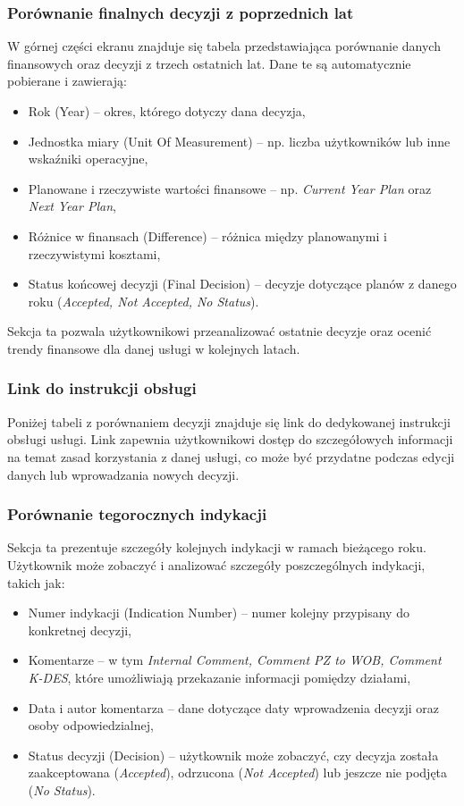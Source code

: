 \subsubsection{Porównanie finalnych decyzji z poprzednich lat}
W górnej części ekranu znajduje się tabela przedstawiająca porównanie danych finansowych oraz decyzji z trzech ostatnich lat. Dane te są automatycznie pobierane i zawierają:
\begin{itemize}
   \item {Rok (Year)} -- okres, którego dotyczy dana decyzja,
   \item {Jednostka miary (Unit Of Measurement)} -- np. liczba użytkowników lub inne wskaźniki operacyjne,
   \item {Planowane i rzeczywiste wartości finansowe} -- np. \textit{Current Year Plan} oraz \textit{Next Year Plan},
   \item {Różnice w finansach (Difference)} -- różnica między planowanymi i rzeczywistymi kosztami,
   \item {Status końcowej decyzji (Final Decision)} -- decyzje dotyczące planów z danego roku (\textit{Accepted, Not Accepted, No Status}).
\end{itemize}

Sekcja ta pozwala użytkownikowi przeanalizować ostatnie decyzje oraz ocenić trendy finansowe dla danej usługi w kolejnych latach.

\subsubsection{Link do instrukcji obsługi}
Poniżej tabeli z porównaniem decyzji znajduje się link do dedykowanej instrukcji obsługi usługi. Link zapewnia użytkownikowi dostęp do szczegółowych informacji na temat zasad korzystania z danej usługi, co może być przydatne podczas edycji danych lub wprowadzania nowych decyzji.

\subsubsection{Porównanie tegorocznych indykacji}
Sekcja ta prezentuje szczegóły kolejnych indykacji w ramach bieżącego roku. Użytkownik może zobaczyć i analizować szczegóły poszczególnych indykacji, takich jak:
\begin{itemize}
   \item {Numer indykacji (Indication Number)} -- numer kolejny przypisany do konkretnej decyzji,
   \item {Komentarze} -- w tym \textit{Internal Comment, Comment PZ to WOB, Comment K-DES}, które umożliwiają przekazanie informacji pomiędzy działami,
   \item {Data i autor komentarza} -- dane dotyczące daty wprowadzenia decyzji oraz osoby odpowiedzialnej,
   \item {Status decyzji (Decision)} -- użytkownik może zobaczyć, czy decyzja została zaakceptowana (\textit{Accepted}), odrzucona (\textit{Not Accepted}) lub jeszcze nie podjęta (\textit{No Status}).
\end{itemize}

